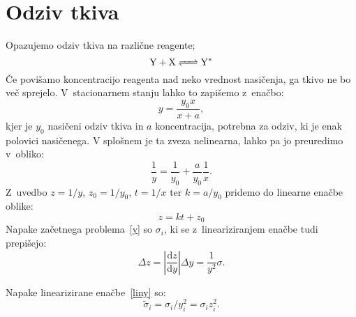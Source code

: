 \documentclass[a4paper,pdftex,12pt]{article}
\numberwithin{figure}{section} %
\begin{document}

\section{Odziv tkiva}
Opazujemo odziv tkiva na različne reagente;
\begin{equation}
    \ce{Y} + \ce{X} \ce{<=>} \ce{Y}^*
\end{equation}
Če povišamo koncentracijo reagenta nad neko vrednost nasičenja, ga tkivo ne bo več
sprejelo. V~stacionarnem stanju lahko to zapišemo z~enačbo:
\begin{equation}\label{y}
    y  = \frac{y_0 x}{x+a},
\end{equation}
kjer je $y_0$ nasičeni odziv tkiva in $a$ koncentracija, potrebna za odziv, ki je enak
polovici nasičenega. V splošnem je ta zveza nelinearna, lahko pa jo preuredimo v~obliko:
\begin{equation}\label{liny}
    \frac{1}{y} = \frac{1}{y_0} + \frac{a}{y_0} \frac{1}{x}.
\end{equation}
Z~uvedbo $z = 1/y$, $z_0 = 1/y_0$, $t = 1/x$ ter $k = a/y_0$ pridemo do linearne 
enačbe oblike:
\begin{equation}\label{linz}
    z = kt + z_0
\end{equation}
Napake začetnega problema~\ref{y} so $\sigma_i$, ki se z~lineariziranjem enačbe tudi 
prepišejo:
\begin{equation}
    \Delta z = \left|{\frac{\mathrm{d}z}{\mathrm{d} y}} \right| \Delta y = \frac{1}{y^2} 
    \sigma.
\end{equation}

Napake linearizirane enačbe~\ref{liny} so: 
\begin{equation}\label{napaka}
    \widetilde{\sigma}_i = \sigma_i /y_i^2 = \sigma_i z_i^2. 
\end{equation}
\end{document}
